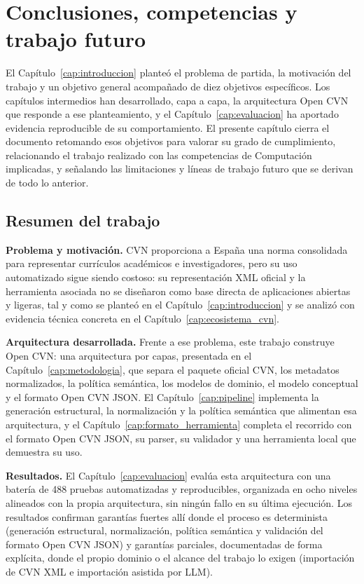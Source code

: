 \chapter{Conclusiones, competencias y trabajo futuro}
\label{cap:conclusiones}

El Capítulo~\ref{cap:introduccion} planteó el problema de partida, la
motivación del trabajo y un objetivo general acompañado de diez objetivos
específicos. Los capítulos intermedios han desarrollado, capa a capa, la
arquitectura Open CVN que responde a ese planteamiento, y el
Capítulo~\ref{cap:evaluacion} ha aportado evidencia reproducible de su
comportamiento. El presente capítulo cierra el documento retomando esos
objetivos para valorar su grado de cumplimiento, relacionando el trabajo
realizado con las competencias de Computación implicadas, y señalando las
limitaciones y líneas de trabajo futuro que se derivan de todo lo anterior.

\section{Resumen del trabajo}
\label{sec:conclusiones_resumen}

\textbf{Problema y motivación.} CVN proporciona a España una norma
consolidada para representar currículos académicos e investigadores, pero
su uso automatizado sigue siendo costoso: su representación XML oficial y
la herramienta asociada no se diseñaron como base directa de aplicaciones
abiertas y ligeras, tal y como se planteó en el
Capítulo~\ref{cap:introduccion} y se analizó con evidencia técnica concreta
en el Capítulo~\ref{cap:ecosistema_cvn}.

\textbf{Arquitectura desarrollada.} Frente a ese problema, este trabajo
construye Open CVN: una arquitectura por capas, presentada en el
Capítulo~\ref{cap:metodologia}, que separa el paquete oficial CVN, los
metadatos normalizados, la política semántica, los modelos de dominio, el
modelo conceptual y el formato Open CVN JSON. El
Capítulo~\ref{cap:pipeline} implementa la generación estructural, la
normalización y la política semántica que alimentan esa arquitectura, y el
Capítulo~\ref{cap:formato_herramienta} completa el recorrido con el
formato Open CVN JSON, su parser, su validador y una herramienta local que
demuestra su uso.

\textbf{Resultados.} El Capítulo~\ref{cap:evaluacion} evalúa esta
arquitectura con una batería de 488 pruebas automatizadas y reproducibles,
organizada en ocho niveles alineados con la propia arquitectura, sin
ningún fallo en su última ejecución. Los resultados confirman garantías
fuertes allí donde el proceso es determinista (generación estructural,
normalización, política semántica y validación del formato Open CVN JSON)
y garantías parciales, documentadas de forma explícita, donde el propio
dominio o el alcance del trabajo lo exigen (importación de CVN XML e
importación asistida por LLM).

